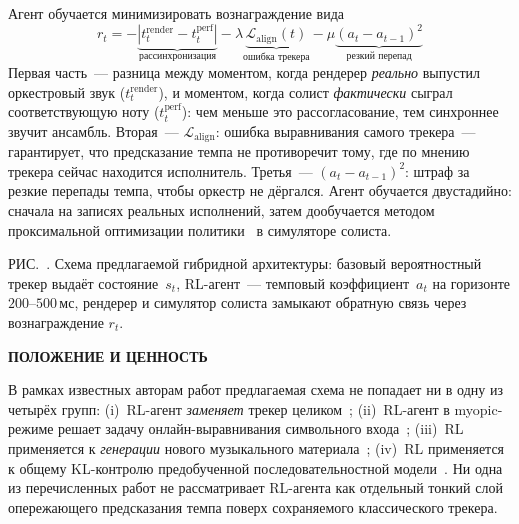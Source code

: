 \documentclass[%
  aps,pre,
  superscriptaddress,
  longbibliography,nofootinbib,
  showkeys,
  amsmath,amssymb,floatfix
]{revtex4-2}
\makeatletter
\newcommand{\eqlab}[1]{\label{eq:#1}}
\newcommand{\seclab}[1]{\label{sec:#1}}
\newcommand{\figlab}[1]{\label{fig:#1}}
\newcounter{musecct}
\newcommand{\sect}[2]{%
  \par\addvspace{1.0\baselineskip}%
  \refstepcounter{musecct}%
  \begingroup
    \centering
    \normalsize\bfseries
    \MakeUppercase{#1}%
    \par
  \endgroup
  \seclab{#2}%
  \nopagebreak
  \addvspace{0.5\baselineskip}%
  \@afterindentfalse\@afterheading
  \ignorespaces}
\renewcommand{\figurename}{РИС.}%
\makeatother
\begin{document}
Агент обучается минимизировать вознаграждение вида
\begin{equation}
r_t = -\underbrace{|t^{\text{render}}_t - t^{\text{perf}}_t|}_{\text{рассинхронизация}}
      - \lambda\underbrace{\mathcal{L}_{\text{align}}(t)}_{\text{ошибка трекера}}
      - \mu\underbrace{(a_t - a_{t-1})^2}_{\text{резкий перепад}}
\eqlab{reward-thesis}
\end{equation}
Первая часть~--- разница между моментом, когда рендерер
\textit{реально} выпустил оркестровый звук ($t^{\text{render}}_t$),
и моментом, когда солист \textit{фактически} сыграл
соответствующую ноту ($t^{\text{perf}}_t$): чем меньше это
рассогласование, тем синхроннее звучит ансамбль. Вторая~---
$\mathcal{L}_{\text{align}}$: ошибка выравнивания самого
трекера~--- гарантирует, что предсказание темпа не противоречит
тому, где по мнению трекера сейчас находится исполнитель.
Третья~--- $(a_t - a_{t-1})^2$: штраф за резкие перепады темпа,
чтобы оркестр не дёргался. Агент обучается двустадийно: сначала
на записях реальных исполнений, затем дообучается методом
проксимальной оптимизации политики~\cite{Schulman2017PPO} в
симуляторе солиста.

\par\addvspace{2pt}
{\centering
{}\figlab{rl-agent}%
\resizebox{0.55\linewidth}{!}{}\par
\vspace{2pt}
\footnotesize
\figurename~\thefigure. Схема предлагаемой гибридной архитектуры:
базовый вероятностный трекер выдаёт состояние~$s_t$, RL-агент~---
темповый коэффициент~$a_t$ на горизонте $200$--$500$\,мс,
рендерер и симулятор солиста замыкают обратную связь через
вознаграждение $r_t$.\par}
\addvspace{4pt}

\sect{Положение и ценность}{position}
%
В рамках известных авторам работ предлагаемая схема не попадает
ни в одну из четырёх групп: (i)~RL-агент \textit{заменяет} трекер
целиком~\cite{Dorfer2018RL}; (ii)~RL-агент в myopic-режиме
решает задачу онлайн-выравнивания символьного
входа~\cite{Peter2023}; (iii)~RL применяется к \textit{генерации}
нового музыкального материала~\cite{Jiang2020RLDuet,Wu2024ReaLchords};
(iv)~RL применяется к общему KL-контролю предобученной
последовательностной модели~\cite{Jaques2017SeqTutor}. Ни одна
из перечисленных работ не рассматривает RL-агента как отдельный
тонкий слой опережающего предсказания темпа поверх сохраняемого
классического трекера.
\end{document}
